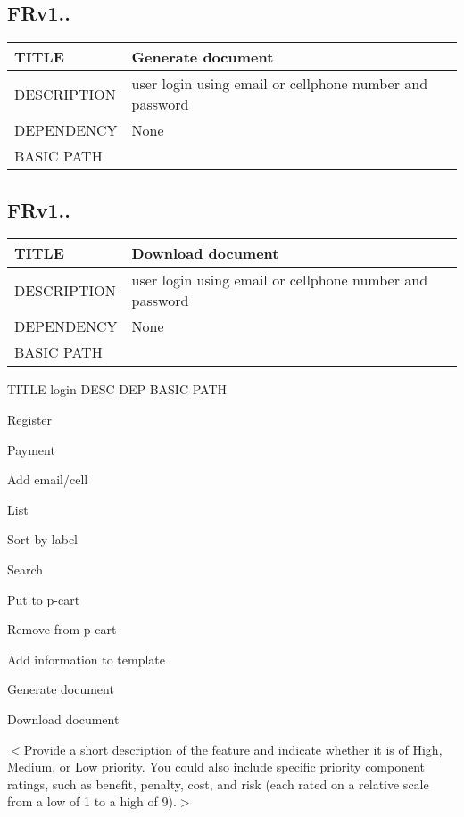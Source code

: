 \documentclass{scrreprt}
\begin{document}
\subsection{FRv1..}
\begin{table}[]
    \centering
    \begin{tabular}{|l|l|}
        \hline
         TITLE& Generate document\\ \hline
         DESCRIPTION& user login using email or cellphone number and password   \\ \hline
         DEPENDENCY& None \\ \hline
         BASIC PATH&  \\ \hline
    \end{tabular}
\end{table}

\subsection{FRv1..}
\begin{table}[]
    \centering
    \begin{tabular}{|l|l|}
        \hline
         TITLE& Download document\\ \hline
         DESCRIPTION& user login using email or cellphone number and password   \\ \hline
         DEPENDENCY& None \\ \hline
         BASIC PATH&  \\ \hline
    \end{tabular}
\end{table}

TITLE login
DESC
DEP
BASIC PATH

Register

Payment

Add email/cell

List

Sort by label

Search

Put to p-cart

Remove from p-cart

Add information to template

Generate document

Download document

$<$Provide a short description of the feature and indicate whether it is of 
High, Medium, or Low priority. You could also include specific priority 
component ratings, such as benefit, penalty, cost, and risk (each rated on a 
relative scale from a low of 1 to a high of 9).$>$
\end{document}
